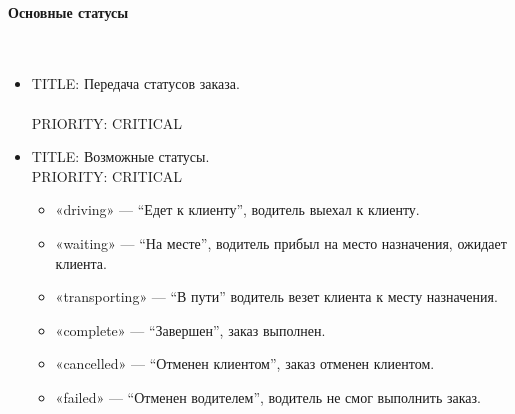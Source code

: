             \paragraph{Основные статусы} \mbox{} \label{main_order_status_for_agg} \\

            	\begin{itemize}

           			\item{

           				TITLE: Передача статусов заказа.\\
           				\\
           				PRIORITY: CRITICAL\\

           			}

           			\item {

           				TITLE: Возможные статусы.\\
           				PRIORITY: CRITICAL
           			}

           				\begin{itemize}
           					
           					\item{«driving» — “Едет к клиенту”, водитель выехал к клиенту.}

           					\item{«waiting» — “На месте”, водитель прибыл на место назначения, ожидает клиента.}

           					\item{«transporting» — “В пути” водитель везет клиента к месту назначения.}

           					\item{«complete» — “Завершен”, заказ выполнен.} 

           					\item{«cancelled» — “Отменен клиентом”, заказ отменен клиентом.}
           					
           					\item{«failed» — “Отменен водителем”, водитель не смог выполнить заказ.}

           				\end{itemize}
           			


\end{itemize}
